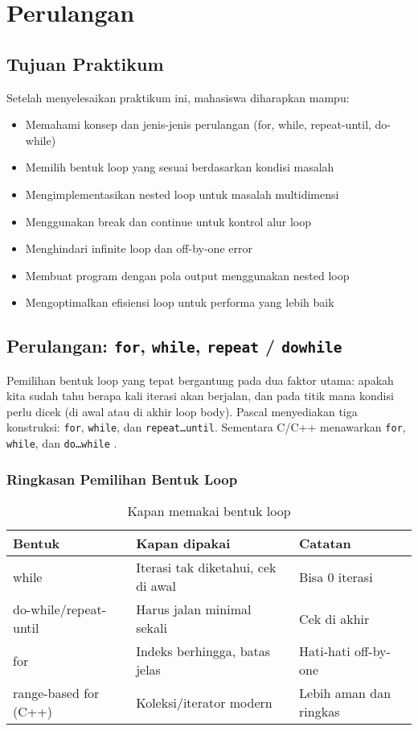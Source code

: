 \documentclass[../main.tex]{subfiles}
\begin{document}
\chapter{Perulangan}

\section*{Tujuan Praktikum}
Setelah menyelesaikan praktikum ini, mahasiswa diharapkan mampu:
\begin{itemize}
  \item Memahami konsep dan jenis-jenis perulangan (for, while, repeat-until, do-while)
  \item Memilih bentuk loop yang sesuai berdasarkan kondisi masalah
  \item Mengimplementasikan nested loop untuk masalah multidimensi
  \item Menggunakan break dan continue untuk kontrol alur loop
  \item Menghindari infinite loop dan off-by-one error
  \item Membuat program dengan pola output menggunakan nested loop
  \item Mengoptimalkan efisiensi loop untuk performa yang lebih baik
\end{itemize}

\section{Perulangan: \texttt{for}, \texttt{while}, \texttt{repeat} / \texttt{do\textendash while}}
Pemilihan bentuk loop yang tepat bergantung pada dua faktor utama: apakah kita sudah tahu berapa kali iterasi akan berjalan, dan pada titik mana kondisi perlu dicek (di awal atau di akhir loop body). Pascal menyediakan tiga konstruksi: \texttt{for}, \texttt{while}, dan \texttt{repeat\ldots until}. Sementara C/C++ menawarkan \texttt{for}, \texttt{while}, dan \texttt{do\ldots while} \parencite{free-pascal-docs,gnu-c-manual,cpp-reference}.

\subsection{Ringkasan Pemilihan Bentuk Loop}
\begin{table}[H]
  \centering
  \caption{Kapan memakai bentuk loop}
  \begin{tabular}{@{}lll@{}}
    \toprule
    Bentuk & Kapan dipakai & Catatan \\
    \midrule
    while & Iterasi tak diketahui, cek di awal & Bisa 0 iterasi \\
    do-while/repeat-until & Harus jalan minimal sekali & Cek di akhir \\
    for & Indeks berhingga, batas jelas & Hati-hati off-by-one \\
    range-based for (C++) & Koleksi/iterator modern & Lebih aman dan ringkas \\
    \bottomrule
  \end{tabular}
\end{table}
\end{document}
